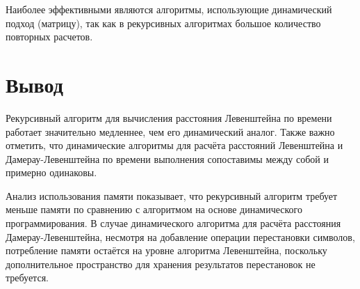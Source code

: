 \clearpage

Наиболее эффективными являются алгоритмы, использующие динамический подход (матрицу), так как в рекурсивных алгоритмах большое количество повторных расчетов.

\section{Вывод}

Рекурсивный алгоритм для вычисления расстояния Левенштейна по времени работает значительно медленнее, чем его динамический аналог. Также важно отметить, что динамические алгоритмы для расчёта расстояний Левенштейна и Дамерау-Левенштейна по времени выполнения сопоставимы между собой и примерно одинаковы.

Анализ использования памяти показывает, что рекурсивный алгоритм требует меньше памяти по сравнению с алгоритмом на основе динамического программирования. В случае динамического алгоритма для расчёта расстояния Дамерау-Левенштейна, несмотря на добавление операции перестановки символов, потребление памяти остаётся на уровне алгоритма Левенштейна, поскольку дополнительное пространство для хранения результатов перестановок не требуется.